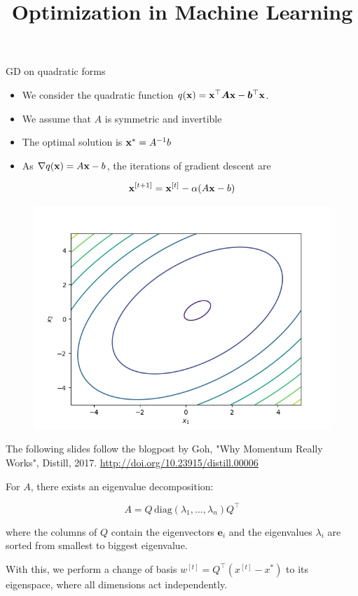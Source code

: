 \documentclass[11pt,compress,t,notes=noshow, xcolor=table]{beamer}
\title{Optimization in Machine Learning}
\date{}
\begin{document}
\sloppy

\begin{vbframe}{GD on quadratic forms}

\begin{itemize}
	\item We consider the quadratic function $q(\mathbf{x}) = \mathbf{x}^\top \bm{A} \mathbf{x} - \bm{b}^\top \mathbf{x}$. 
	\item We assume that $A$ is symmetric and invertible 
	\item The optimal solution is $\mathbf{x}^\ast = A^{-1} b$ 
	\item As $\nabla q(\mathbf{x}) = A \mathbf{x} - b$, the iterations of gradient descent are
\end{itemize}
	$$
	\mathbf{x}^{[ t+1 ] } = \mathbf{x}^{[ t ] } - \alpha (A \mathbf{x} - b)
	$$

\begin{figure}
	\includegraphics[height=0.3\textwidth, keepaspectratio]{figure_man/gd.png} \\
\end{figure}

\begin{footnotesize}
The following slides follow the blogpost by Goh, "Why Momentum Really Works", Distill, 2017. \url{http://doi.org/10.23915/distill.00006}
\end{footnotesize}

\framebreak

For $A$, there exists an eigenvalue decomposition: 

$$
	A = Q \, \text{diag}(\lambda_1, ..., \lambda_n) Q^\top
$$

where the columns of $Q$ contain the eigenvectors $\boldsymbol{e}_i$ and the eigenvalues $\lambda_i$ are sorted from smallest to biggest eigenvalue. 

With this, we perform a change of basis $w^{[ t ] } = Q^\top (x^{[ t ] } - x^\ast)$ to its eigenspace, where all dimensions act independently. 


\end{vbframe}
\end{document}

